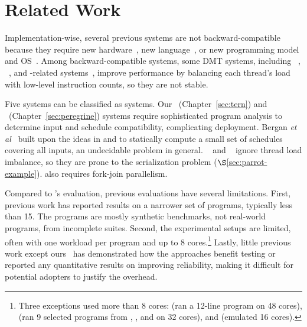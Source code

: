 \vspace{-.02in}
\section{Related Work} \label{sec:parrot-related}
\vspace{-.02in}


 Implementation-wise, several previous systems are 
not backward-compatible because they require new hardware~\cite{dmp:asplos09}, 
new language~\cite{dpj:oopsla09}, or new programming model and
OS~\cite{determinator:osdi10}.  Among backward-compatible systems, some
DMT systems, including \kendo~\cite{kendo:asplos09},
\coredet~\cite{coredet:asplos10}, and \coredet-related
systems~\cite{dos:osdi10, ddos:asplos13}, improve performance by balancing
each thread's load with low-level instruction counts, so they are not
stable.

Five systems can be classified as \smt systems.  Our
\tern~(Chapter~\ref{sec:tern}) and \peregrine~(Chapter~\ref{sec:peregrine}) systems
require sophisticated program analysis to determine input and schedule
compatibility, complicating deployment. Bergan {\it et
  al}~\cite{bergan:oopsla13} built upon the ideas in \tern and \peregrine
to statically compute a small set of schedules covering all inputs, an
undecidable problem in general.  \grace~\cite{grace:oopsla09} and 
\dthreads~\cite{dthreads:sosp11} ignore thread load
imbalance, so they are prone to the serialization problem
($\S$\ref{sec:parrot-example}). \grace also requires
fork-join parallelism.

Compared to \parrot's evaluation, previous evaluations have several limitations.
First, previous work has reported results on a narrower set of programs,
typically less than 15.  The programs are mostly synthetic benchmarks, not
real-world programs, from incomplete suites.  Second, the experimental
setups are limited, often with one workload per program and up to 8
cores.\footnote{Three exceptions used more than 8 cores:
  \cite{kendo:wodet11} (ran a 12-line program on 48 cores),
  \cite{aviram:thesis} (ran 9 selected programs from \parsec, \splashx, and
  \npb on 32 cores), and \cite{dmp:asplos09} (emulated 16 cores).} Lastly, 
little previous work except ours~\cite{cui:tern:osdi10, peregrine:sosp11, 
wu:pldi12} has demonstrated how the approaches benefit testing or reported any 
quantitative results on improving reliability, making it difficult for potential 
adopters to justify the overhead.

